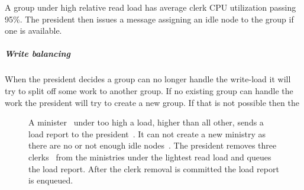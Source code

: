 A group under high relative read load has average clerk CPU utilization passing 95\%. The president then issues a \raft{} message assigning an idle node to the group if one is available. %
%
\subparagraph*{Write balancing}
When the president decides a group can no longer handle the write-load it will try to split off some work to another group. If no existing group can handle the work the president will try to create a new group. If that is not possible then the 




\begin{figure}[htbp]
	\centering
	
	\caption{A minister~\amdsLeg{} under too high a load, higher than all other, sends a load report to the president~\presidentLeg{}. It can not create a new ministry as there are no or not enough idle nodes~\umdsLeg{}. The president removes three clerks~\cmdsLeg{} from the ministries under the lightest read load and queues the load report. After the clerk removal is committed the load report is enqueued. }
	\label{fig:subtree}
\end{figure}
